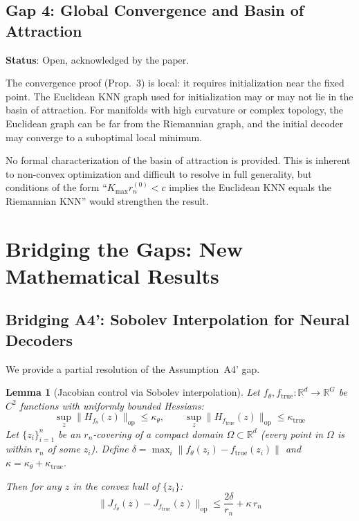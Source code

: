 \documentclass{article}
\newtheorem{lemma}{Lemma}
\DeclareMathOperator{\op}{op}
\newcommand{\RR}{\mathbb{R}}
\begin{document}
\subsection{Gap 4: Global Convergence and Basin of Attraction}

\textbf{Status}: Open, acknowledged by the paper.

The convergence proof (Prop.~3) is local: it requires initialization near the
fixed point. The Euclidean KNN graph used for initialization may or may not
lie in the basin of attraction. For manifolds with high curvature or complex
topology, the Euclidean graph can be far from the Riemannian graph, and the
initial decoder may converge to a suboptimal local minimum.

No formal characterization of the basin of attraction is provided. This is
inherent to non-convex optimization and difficult to resolve in full
generality, but conditions of the form ``$K_{\max} r_n^{(0)} < c$ implies
the Euclidean KNN equals the Riemannian KNN'' would strengthen the result.


\section{Bridging the Gaps: New Mathematical Results}
\label{sec:bridge}

\subsection{Bridging A4': Sobolev Interpolation for Neural Decoders}
\label{sec:bridge_a4}

We provide a partial resolution of the Assumption~A4' gap.

\begin{lemma}[Jacobian control via Sobolev interpolation]
\label{lem:sobolev}
Let $f_\theta, f_{\mathrm{true}}: \RR^d \to \RR^G$ be $C^2$ functions with
uniformly bounded Hessians:
\[
    \sup_z \|H_{f_\theta}(z)\|_{\op} \leq \kappa_\theta, \qquad
    \sup_z \|H_{f_{\mathrm{true}}}(z)\|_{\op} \leq \kappa_{\mathrm{true}}
\]
Let $\{z_i\}_{i=1}^n$ be an $r_n$-covering of a compact domain
$\Omega \subset \RR^d$ (every point in $\Omega$ is within $r_n$ of some
$z_i$). Define $\delta = \max_i \|f_\theta(z_i) - f_{\mathrm{true}}(z_i)\|$
and $\kappa = \kappa_\theta + \kappa_{\mathrm{true}}$.

Then for any $z$ in the convex hull of $\{z_i\}$:
\begin{equation}\label{eq:jac_bound}
    \|J_{f_\theta}(z) - J_{f_{\mathrm{true}}}(z)\|_{\op}
    \leq \frac{2\delta}{r_n} + \kappa\,r_n
\end{equation}
\end{lemma}
\end{document}
